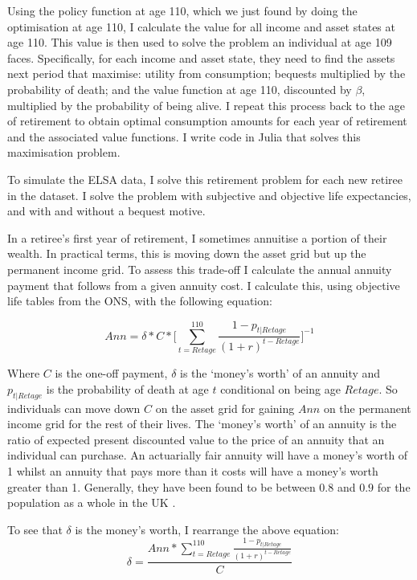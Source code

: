\documentclass[12pt]{article}
\begin{document}
Using the policy function at age 110, which we just found by doing the
optimisation at age 110, I calculate the value for all income and asset states
at age 110. This value is then used to solve the problem an individual at age
109 faces. Specifically, for each income and asset state, they need to find the
assets next period that maximise: utility from consumption; bequests multiplied
by the probability of death; and the value function at age 110, discounted by
$\beta$, multiplied by the probability of being alive. I repeat this process
back to the age of retirement to obtain optimal consumption amounts for each
year of retirement and the associated value functions. I write code in Julia
that solves this maximisation problem.

To simulate the ELSA data, I solve this retirement problem for each new retiree
in the dataset. I solve the problem with subjective and objective life
expectancies, and with and without a bequest motive.

In a retiree's first year of retirement, I sometimes annuitise a portion of
their wealth. In practical terms, this is moving down the asset grid but up the
permanent income grid. To assess this trade-off I calculate the annual annuity
payment that follows from a given annuity cost. I calculate this, using
objective life tables from the ONS, with the following equation:


\begin{equation*}
    Ann = \delta * C * \biggl[\sum_{t = Retage}^{110}\frac{1 - p_{t|Retage}}{(1 + r)^{t - Retage}}\biggr]^{-1}
\end{equation*}

Where $C$ is the one-off payment, $\delta$ is the `money's worth' of an annuity
and $p_{t|Retage}$ is the probability of death at age $t$ conditional on being
age $Retage$. So individuals can move down $C$ on the asset grid for gaining
$Ann$ on the permanent income grid for the rest of their lives. The `money's
worth' of an annuity is the ratio of expected present discounted value to the
price of an annuity that an individual can purchase. An actuarially fair annuity
will have a money's worth of 1 whilst an annuity that pays more than it costs
will have a money's worth greater than 1. Generally, they have been found to be
between $0.8$ and $0.9$ for the population as a whole in the UK
\citep{finkelstein_porteba_2002, finkelstein_porteba_2004, mitchell_et_al_1999}.

To see that $\delta$ is the money's worth, I rearrange the above equation:
\begin{equation*}
    \delta =  \frac{Ann*\sum_{t = Retage}^{110}\frac{1 - p_{t|Retage}}{(1 + r)^{t - Retage}}}{C}
\end{equation*}
\end{document}

